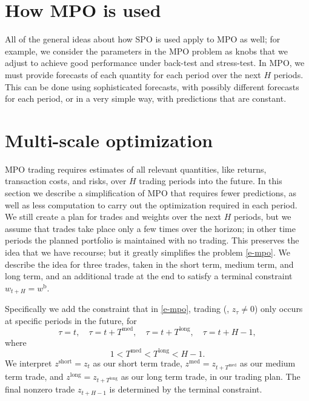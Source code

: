 \documentclass[openany]{now}
\newcommand{\wb}{w^\mathrm{b}}
\begin{document}
\section{How MPO is used}
All of the general ideas about how SPO is used apply to MPO as well;
for example, we consider the parameters in the MPO problem as knobs that we adjust
to achieve good performance under back-test and stress-test.
In MPO, we must provide forecasts of each quantity for each period over the
next $H$ periods.  This can be done using sophisticated forecasts, with possibly
different forecasts for each period, or in a very simple way,
with predictions that are constant.

\section{Multi-scale optimization}\label{s-mso}

MPO trading requires estimates of all relevant quantities,
like returns, transaction costs, and risks, over $H$ trading periods
into the future.
In this section we describe a simplification of MPO that requires
fewer predictions, as well as less computation to carry out the
optimization required in each period.
We still create a plan for trades and weights
over the next $H$ periods, but we assume that
trades take place only a few times over the horizon;
in other time periods the planned portfolio is maintained with no trading.
This preserves the idea that we have recourse; but it greatly
simplifies the problem \eqref{e-mpo}.
We describe the idea for three trades, taken in the short term,
medium term, and long term, and an additional
trade at the end to satisfy a terminal constraint $w_{t+H}=\wb$.

Specifically we add the constraint that in \eqref{e-mpo}, trading
(\ie, $z_\tau \neq 0$) only
occurs at specific periods in the future, for
\[
\tau =t, \quad \tau=t+T^\mathrm{med}, \quad \tau=t+T^\mathrm{long},
\quad \tau= t+ H-1,
\]
where
\[
1< T^\mathrm{med} <T^\mathrm{long} < H-1.
\]
We interpret $z^\mathrm{short}= z_t$ as our short term trade,
$z^\mathrm{med} = z_{t+T^\mathrm{med}}$ as our medium term trade,
and $z^\mathrm{long} = z_{t+T^\mathrm{long}}$ as our long term trade,
in our trading plan.  The final nonzero trade $z_{t+H-1}$ is determined
by the terminal constraint.
\end{document}
